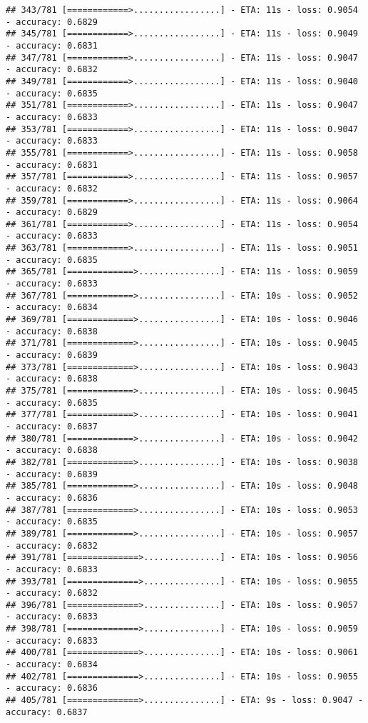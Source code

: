 \documentclass[
]{article}
\begin{document}
\begin{verbatim}
## 343/781 [============>.................] - ETA: 11s - loss: 0.9054 - accuracy: 0.6829
## 345/781 [============>.................] - ETA: 11s - loss: 0.9049 - accuracy: 0.6831
## 347/781 [============>.................] - ETA: 11s - loss: 0.9047 - accuracy: 0.6832
## 349/781 [============>.................] - ETA: 11s - loss: 0.9040 - accuracy: 0.6835
## 351/781 [============>.................] - ETA: 11s - loss: 0.9047 - accuracy: 0.6833
## 353/781 [============>.................] - ETA: 11s - loss: 0.9047 - accuracy: 0.6833
## 355/781 [============>.................] - ETA: 11s - loss: 0.9058 - accuracy: 0.6831
## 357/781 [============>.................] - ETA: 11s - loss: 0.9057 - accuracy: 0.6832
## 359/781 [============>.................] - ETA: 11s - loss: 0.9064 - accuracy: 0.6829
## 361/781 [============>.................] - ETA: 11s - loss: 0.9054 - accuracy: 0.6833
## 363/781 [============>.................] - ETA: 11s - loss: 0.9051 - accuracy: 0.6835
## 365/781 [=============>................] - ETA: 11s - loss: 0.9059 - accuracy: 0.6833
## 367/781 [=============>................] - ETA: 10s - loss: 0.9052 - accuracy: 0.6834
## 369/781 [=============>................] - ETA: 10s - loss: 0.9046 - accuracy: 0.6838
## 371/781 [=============>................] - ETA: 10s - loss: 0.9045 - accuracy: 0.6839
## 373/781 [=============>................] - ETA: 10s - loss: 0.9043 - accuracy: 0.6838
## 375/781 [=============>................] - ETA: 10s - loss: 0.9045 - accuracy: 0.6835
## 377/781 [=============>................] - ETA: 10s - loss: 0.9041 - accuracy: 0.6837
## 380/781 [=============>................] - ETA: 10s - loss: 0.9042 - accuracy: 0.6838
## 382/781 [=============>................] - ETA: 10s - loss: 0.9038 - accuracy: 0.6839
## 385/781 [=============>................] - ETA: 10s - loss: 0.9048 - accuracy: 0.6836
## 387/781 [=============>................] - ETA: 10s - loss: 0.9053 - accuracy: 0.6835
## 389/781 [=============>................] - ETA: 10s - loss: 0.9057 - accuracy: 0.6832
## 391/781 [==============>...............] - ETA: 10s - loss: 0.9056 - accuracy: 0.6833
## 393/781 [==============>...............] - ETA: 10s - loss: 0.9055 - accuracy: 0.6832
## 396/781 [==============>...............] - ETA: 10s - loss: 0.9057 - accuracy: 0.6833
## 398/781 [==============>...............] - ETA: 10s - loss: 0.9059 - accuracy: 0.6833
## 400/781 [==============>...............] - ETA: 10s - loss: 0.9061 - accuracy: 0.6834
## 402/781 [==============>...............] - ETA: 10s - loss: 0.9055 - accuracy: 0.6836
## 405/781 [==============>...............] - ETA: 9s - loss: 0.9047 - accuracy: 0.6837 

\end{verbatim}
\end{document}
